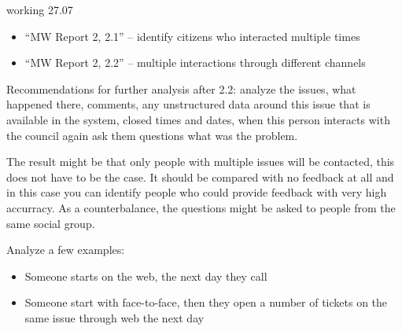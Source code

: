 working 27.07
 
\begin{itemize}
\item “MW Report 2, 2.1” – identify citizens who interacted multiple times
\item “MW Report 2, 2.2” – multiple interactions through different channels
\end{itemize}

Recommendations for further analysis after 2.2: analyze the issues, what happened there, comments, any unstructured data around this issue that is available in the system, closed times and dates, when this person interacts with the council again ask them questions what was the problem.
 
The result might be that only people with multiple issues will be contacted, this does not have to be the case. It should be compared with no feedback at all and in this case you can identify people who could provide feedback with very high accurracy. As a counterbalance, the questions might be asked to people from the same social group.
 
Analyze a few examples:
\begin{itemize}
\item Someone starts on the web, the next day they call 
\item Someone start with face-to-face, then they open a number of tickets on the same issue through web the next day
\end{itemize}